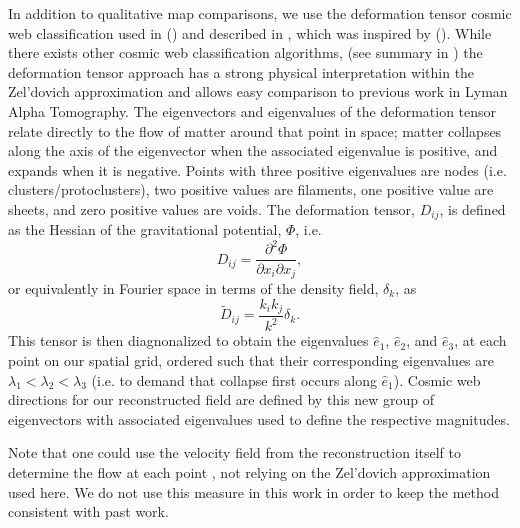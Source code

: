 \documentclass[times]{aastex62}
\begin{document}
In addition to qualitative map comparisons, we use the deformation tensor cosmic web classification used in (\cite{2017Krolewski}) and described in \cite{2016LeeWhite}, which was inspired by (\cite{2007Hahn}). While there exists other cosmic web classification algorithms, (see summary in \cite{2014Cautun}) the deformation tensor approach has a strong physical interpretation within the Zel'dovich approximation
\citep{1970Zeldovich} and allows easy comparison to previous work in Lyman Alpha Tomography. The eigenvectors and eigenvalues of the deformation tensor relate directly to the flow of matter around that point in space; matter collapses along the axis of the eigenvector when the associated eigenvalue is positive, and expands when it is negative. Points with three positive eigenvalues are nodes (i.e. clusters/protoclusters), two positive values are filaments, one positive value are sheets, and zero positive values are voids. The deformation tensor, $D_{ij}$, is defined as the Hessian of the gravitational potential, $\Phi$, i.e.
\begin{equation}
    D_{ij} = \frac{\partial^2 \Phi}{\partial x_{i} \partial x_{j}},
    \label{eq:diften}
\end{equation}
or equivalently in Fourier space in terms of the density field, $\delta_k$, as
\begin{equation}
    \tilde{D}_{ij} = \frac{k_i k_j}{k^2}\delta_k.
    \label{eq:diften_k}
\end{equation}
This tensor is then diagnonalized to obtain the eigenvalues $\hat{e}_1$, $\hat{e}_2$, and $\hat{e}_3$, at each point on our spatial grid, ordered such that their corresponding eigenvalues are $\lambda_1<\lambda_2<\lambda_3$ (i.e. to demand that collapse first occurs along $\hat{e}_1$). Cosmic web directions for our reconstructed field are defined by this new group of eigenvectors with associated eigenvalues used to define the respective magnitudes. 

Note that one could use the velocity field from the reconstruction itself to determine the flow at each point
\citep[e.g.][]{2013Libeskind,2016Pahwa}, not relying on the Zel'dovich approximation used here. We do not use this measure in this work in order to keep the method consistent with past work.


\end{document}

